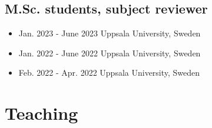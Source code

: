 \documentclass[10pt,A4]{article} %
\begin{document}
  \subsection{\noindent M.Sc.  students, subject reviewer  }
  \begin{itemize}
    
        \item {}
        { Jan. 2023 - June 2023 }
        { Uppsala University, Sweden }
        {  }
     
        \item {}
        { Jan. 2022 - June 2022 }
        { Uppsala University, Sweden }
        {  }
     
        \item {}
        { Feb. 2022 - Apr. 2022 }
        { Uppsala University, Sweden }
        {  }
     
  \end{itemize}



\section{Teaching}
\end{document}
